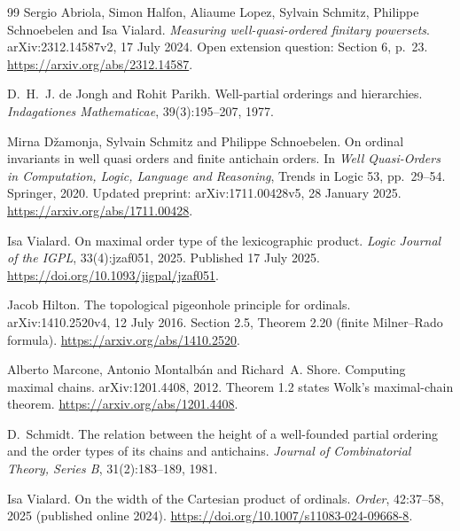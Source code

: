 \begin{thebibliography}{99}
Sergio Abriola, Simon Halfon, Aliaume Lopez, Sylvain Schmitz, Philippe
Schnoebelen and Isa Vialard.
\newblock \emph{Measuring well-quasi-ordered finitary powersets}.
\newblock arXiv:2312.14587v2, 17 July 2024.
\newblock Open extension question: Section 6, p.~23.
\newblock \url{https://arxiv.org/abs/2312.14587}.

D.~H.~J. de Jongh and Rohit Parikh.
\newblock Well-partial orderings and hierarchies.
\newblock \emph{Indagationes Mathematicae}, 39(3):195--207, 1977.

Mirna D{\v z}amonja, Sylvain Schmitz and Philippe Schnoebelen.
\newblock On ordinal invariants in well quasi orders and finite antichain orders.
\newblock In \emph{Well Quasi-Orders in Computation, Logic, Language and
Reasoning}, Trends in Logic 53, pp.~29--54. Springer, 2020.
\newblock Updated preprint: arXiv:1711.00428v5, 28 January 2025.
\newblock \url{https://arxiv.org/abs/1711.00428}.

Isa Vialard.
\newblock On maximal order type of the lexicographic product.
\newblock \emph{Logic Journal of the IGPL}, 33(4):jzaf051, 2025.
\newblock Published 17 July 2025.
\newblock \url{https://doi.org/10.1093/jigpal/jzaf051}.

Jacob Hilton.
\newblock The topological pigeonhole principle for ordinals.
\newblock arXiv:1410.2520v4, 12 July 2016.
\newblock Section 2.5, Theorem 2.20 (finite Milner--Rado formula).
\newblock \url{https://arxiv.org/abs/1410.2520}.

Alberto Marcone, Antonio Montalb\'an and Richard~A. Shore.
\newblock Computing maximal chains.
\newblock arXiv:1201.4408, 2012.
\newblock Theorem 1.2 states Wolk's maximal-chain theorem.
\newblock \url{https://arxiv.org/abs/1201.4408}.

D.~Schmidt.
\newblock The relation between the height of a well-founded partial ordering
and the order types of its chains and antichains.
\newblock \emph{Journal of Combinatorial Theory, Series B}, 31(2):183--189, 1981.

Isa Vialard.
\newblock On the width of the Cartesian product of ordinals.
\newblock \emph{Order}, 42:37--58, 2025 (published online 2024).
\newblock \url{https://doi.org/10.1007/s11083-024-09668-8}.


\end{thebibliography}
